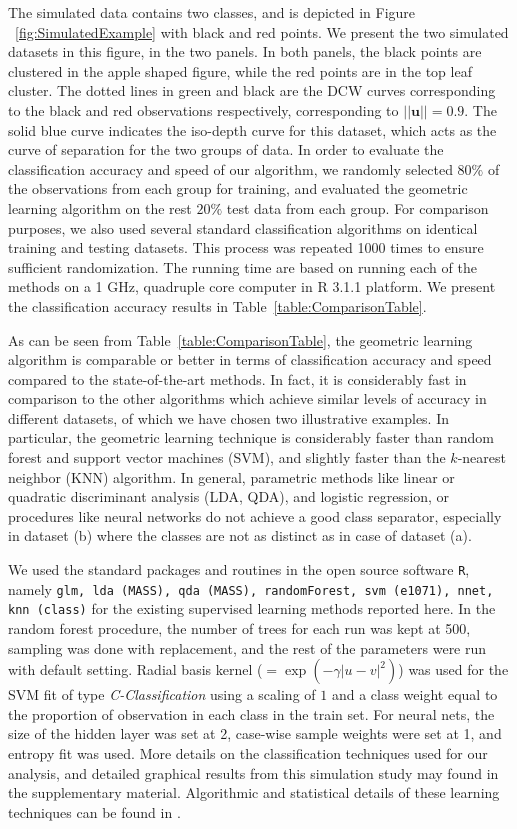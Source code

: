 \documentclass[twoside]{article}
\begin{document}
The simulated data contains two classes, and is depicted in 
Figure ~\ref{fig:SimulatedExample} with black and red points.  
We present the two simulated datasets in this figure, in the two panels.
In both panels, the black points are clustered in the apple shaped figure, while 
 the red points are in the top leaf cluster. The dotted lines in green and black 
 are the DCW curves corresponding to the black and red observations respectively, 
 corresponding to $|| \mathbf{u} || = 0.9$. The solid blue curve indicates the 
 iso-depth curve for this dataset, which acts as the curve of separation for the 
 two groups of data. In order to evaluate the classification accuracy 
 and speed of our algorithm, we 
 randomly selected $80 \%$ of the observations from each group for training, 
 and evaluated the 
 geometric learning algorithm on the rest $20 \%$ test data from each group. 
 For comparison purposes, 
 we also used several standard classification algorithms on identical training 
 and testing datasets. 
  This process was repeated 1000 times to ensure sufficient randomization. 
The running time are based on running each of the methods on a 1 GHz, quadruple core computer in R 3.1.1 platform. We present the classification accuracy results in 
 Table~\ref{table:ComparisonTable}. 
 
  
 As can be seen from  Table~\ref{table:ComparisonTable}, the geometric learning algorithm 
is comparable or better in terms of classification accuracy and speed compared to the 
state-of-the-art methods. 
In fact, it is considerably fast in comparison to the other algorithms 
which achieve similar levels of accuracy in different datasets, of which we have 
chosen two illustrative examples. In particular, the geometric learning technique is 
considerably faster than random forest and support vector machines (SVM), and 
slightly faster than the $k$-nearest neighbor (KNN) algorithm. 
In general, parametric methods like linear or quadratic discriminant analysis (LDA, QDA), 
and logistic regression, or procedures like  neural networks do not achieve 
a good class separator, especially in dataset (b) where the classes are 
not as distinct as in case of dataset (a). 

We used the standard packages and routines in the open source software {\tt R}, namely 
{\tt glm, lda (MASS), qda (MASS), randomForest, svm (e1071), nnet, knn (class)}
for the existing supervised learning methods reported here. 
In the random forest procedure, the number of trees for each run was kept at 500, 
sampling was done with replacement, and the rest of the parameters 
were run with default setting. Radial basis kernel 
($ = \exp ( - \gamma | u - v |^2 ) $) was used for the SVM fit of type \textit{C-Classification} using a scaling of $1$ and a class weight 
equal to the proportion of observation in each class in the train set. 
For neural nets, the size of the hidden layer was set at 2, case-wise sample 
weights were set at 1, and entropy fit was used. 
More details on the classification techniques 
used for our analysis, and detailed graphical results from this simulation study may 
found in the supplementary material. Algorithmic and statistical details of 
these learning techniques can be found in \cite{HTF09}.
\end{document}
